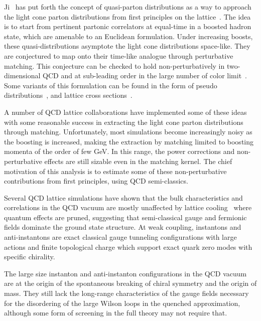 \documentclass[11pt,aps,amsmath,amssymb,nofootinbib,notitlepage,longbibliography]{revtex4-1}
\begin{document}
 Ji~\cite{Ji:2013dva} has put forth the concept of quasi-parton distributions as a way to approach the light cone parton distributions
from first principles on the lattice~\cite{Zhang:2017bzy,Ji:2015qla,Bali:2018spj,Alexandrou:2018eet,Izubuchi:2019lyk,Izubuchi:2018srq}.
The idea is to start from pertinent partonic correlators at equal-time in a boosted hadron state, which
are amenable to an  Euclidean formulation. Under increasing boosts, these quasi-distributions asymptote the light cone distributions
space-like. They are conjectured to map onto their time-like analogue through perturbative matching.  This conjecture can be checked
to hold non-perturbatively in two-dimensional QCD and at sub-leading order in the large number of color limit~\cite{Ji:2018waw}. Some  variants of this
formulation can be found in the form of pseudo distributions~\cite{Radyushkin:2017gjd}, and lattice cross sections~\cite{Ma:2014jla}.


A  number of QCD lattice collaborations have implemented some of these ideas with some reasonable success in extracting
the light cone parton distributions through matching. Unfortunately, most simulations become increasingly noisy as the boosting
is increased, making the extraction by matching limited to boosting momenta of the order of few GeV. In this range, the power
corrections and non-perturbative effects are still sizable even in the matching kernel. The chief motivation of this analysis is
to estimate some of these non-perturbative contributions from first principles, using QCD semi-classics.



Several QCD lattice simulations have shown  that the bulk characteristics and correlations  in the QCD vacuum
are mostly unaffected by lattice cooling~\cite{Chu:1994vi} where quantum effects are pruned,  suggesting that semi-classical gauge
and fermionic fields dominate  the ground state structure. At weak coupling, instantons and anti-instantons
are exact classical gauge tunneling configurations with large actions and finite topological charge which
support exact quark zero modes with specific chirality.


The large size instanton and anti-instanton configurations in the QCD vacuum are at the origin of the spontaneous breaking
of chiral symmetry and the origin of mass. They still lack the long-range characteristics of the gauge fields necessary for the
disordering of the large Wilson loops in the quenched approximation, although some form of screening in the full theory may
not require that.
\end{document}
